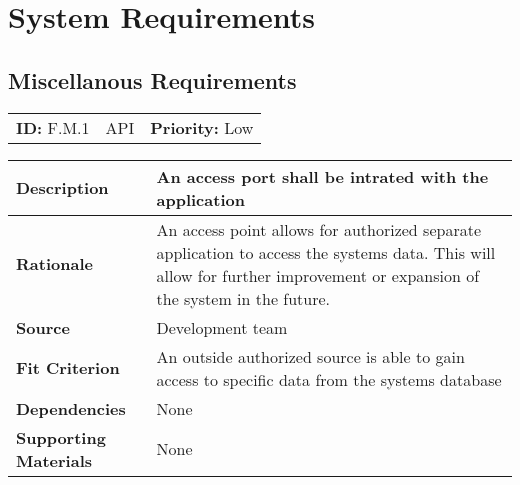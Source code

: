 
\section{System Requirements}


\subsection{}

\subsection{Miscellanous Requirements}

\begin{table}[H]
    \begin{tabularx}{\textwidth}{| l | X | l |}
        \hline
        \textbf{ID:} F.M.1 & API & \textbf{Priority:} Low \\
    \end{tabularx}
    \begin{tabularx}{\textwidth}{| l | X |}
        \hline
        \textbf{Description} & An access port shall be intrated with the application \\ \hline
        \textbf{Rationale} & An access point allows for authorized separate application to access the systems data. This will allow for further improvement or expansion of the system in the future.\\ \hline
        \textbf{Source} &  Development team\\ \hline
        \textbf{Fit Criterion} & An outside authorized source is able to gain access to specific data from the systems database   \\ \hline
        \textbf{Dependencies} & None \\ \hline
        \textbf{Supporting Materials} & None \\ \hline
    \end{tabularx}
\end{table}

